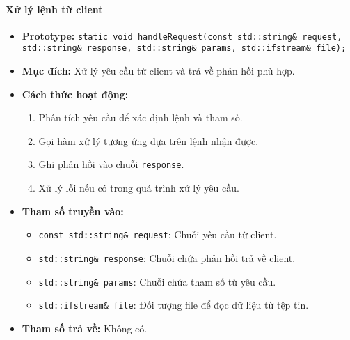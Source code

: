 \paragraph{\textbf{Xử lý lệnh từ client}}
\begin{itemize}
    \item \textbf{Prototype:} \texttt{static void handleRequest(const std::string\& request, std::string\& response, std::string\& params, std::ifstream\& file);}
    \item \textbf{Mục đích:} Xử lý yêu cầu từ client và trả về phản hồi phù hợp.
    \item \textbf{Cách thức hoạt động:}
          \begin{enumerate}
            \item Phân tích yêu cầu để xác định lệnh và tham số.
            \item Gọi hàm xử lý tương ứng dựa trên lệnh nhận được.
            \item Ghi phản hồi vào chuỗi \texttt{response}.
            \item Xử lý lỗi nếu có trong quá trình xử lý yêu cầu.
          \end{enumerate}
    \item \textbf{Tham số truyền vào:}
    \begin{itemize}
        \item \texttt{const std::string\& request}: Chuỗi yêu cầu từ client.
        \item \texttt{std::string\& response}: Chuỗi chứa phản hồi trả về client.
        \item \texttt{std::string\& params}: Chuỗi chứa tham số từ yêu cầu.
        \item \texttt{std::ifstream\& file}: Đối tượng file để đọc dữ liệu từ tệp tin.
    \end{itemize}
    \item \textbf{Tham số trả về:} Không có.
\end{itemize}